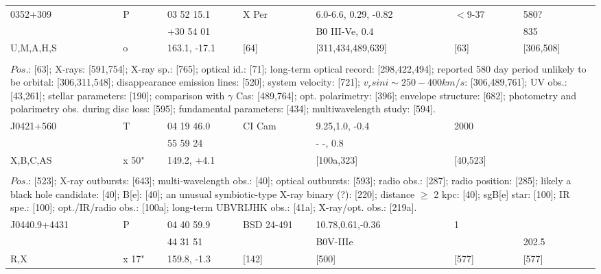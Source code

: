 \documentclass{aa}
\begin{document}
\begin{table*}[h]
\begin{tabular}{p{2.5cm}p{1cm}p{1.8cm}p{2.3cm}p{3.3cm}p{2.0cm}p{2.2cm}}
\noalign{\smallskip}
\hline
\noalign{\smallskip}
 0352+309     &   P      & 03 52 15.1       & X Per        & 6.0-6.6, 0.29, -0.82  & $<$9-37  & 580?          \\
                        &           & +30 54 01         &                   & B0 III-Ve, 0.4           &                  & 835             \\
U,M,A,H,S     &  o      & 163.1, -17.1      &     [64]       & [311,434,489,639]   & [63]          & [306,508]  \\
\\
\multicolumn{7}{p{17.5cm}}{
$Pos$.: [63]; X-rays: [591,754]; X-ray sp.: [765]; optical id.: [71]; long-term optical record: [298,422,494]; reported 580 
day period unlikely to be orbital: [306,311,548]; disappearance emission lines: [520]; system velocity: [721];
$v_rsin i \sim 250-400 km/s$: [306,489,761]; UV obs.: [43,261]; stellar parameters: [190]; comparison with $\gamma$ 
Cas: [489,764]; opt. polarimetry: [396]; envelope structure: [682]; photometry and polarimetry obs. during disc loss: [595];
fundamental parameters: [434]; multiwavelength study: [594].}\\


\noalign{\smallskip}
\hline
\noalign{\smallskip}
J0421+560    &   T        &    04 19 46.0    &  CI Cam     & 9.25,1.0, -0.4      &  2000          &  \\                     
                        &              &   55 59 24        &                     & - -, 0.8                     &                     &    \\
X,B,C,AS      &  x 50"   & 149.2, +4.1      &                     & [100a,323]            &   [40,523]    &       \\
  
\\
\multicolumn{7}{p{17.5cm}}{
$Pos$.: [523]; X-ray outbursts: [643]; multi-wavelength obs.: [40]; optical outbursts: [593]; 
  radio obs.: [287]; radio position: [285]; likely a black hole candidate: [40]; B[e]: [40]; an unusual symbiotic-type 
X-ray binary (?): [220]; distance $\geq$ 2 kpc: [40]; sgB[e] star: [100]; IR spe.: [100]; opt./IR/radio obs.: [100a]; 
long-term UBVRIJHK obs.: [41a]; X-ray/opt. obs.: [219a].     }\\

\noalign{\smallskip}
\hline
\noalign{\smallskip}
J0440.9+4431   &   P           &  04 40 59.9    &  BSD 24-491  & 10.78,0.61,-0.36      & 1           &        \\
                             &                & 44 31 51         &                          &   B0V-IIIe                  &             &  202.5   \\
R,X                      &  x 17"     & 159.8, -1.3      &     [142]           &         [500]                  & [577]    &   [577]  \\
  

\end{tabular}
\end{table*}
\end{document}
